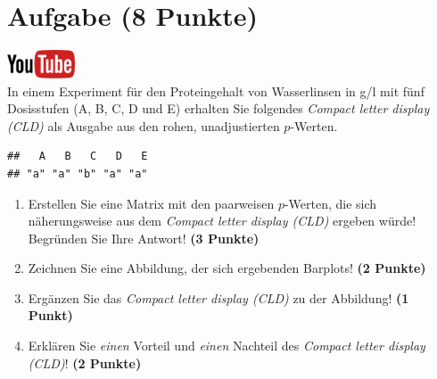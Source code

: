 \documentclass[a4paper, 10pt]{scrartcl}\usepackage[]{graphicx}\usepackage[]{xcolor}
\makeatletter
\newenvironment{kframe}{%
 \def\at@end@of@kframe{}%
 \ifinner\ifhmode%
  \def\at@end@of@kframe{\end{minipage}}%
  \begin{minipage}{\columnwidth}%
 \fi\fi%
 \def\FrameCommand##1{\hskip\@totalleftmargin \hskip-\fboxsep
 \colorbox{shadecolor}{##1}\hskip-\fboxsep
     \hskip-\linewidth \hskip-\@totalleftmargin \hskip\columnwidth}%
 \MakeFramed {\advance\hsize-\width
   \@totalleftmargin\z@ \linewidth\hsize
   \@setminipage}}%
 {\par\unskip\endMakeFramed%
 \at@end@of@kframe}
\newenvironment{knitrout}{}{} %
\makeatother
\begin{document}
 
\clearpage

\section{Aufgabe \hfill (8 Punkte)}


 \hfill\href{https://youtu.be/xq29O8qDrg0}{\includegraphics[width =
   2cm]{img/youtube}}\\[1Ex]


 
 In einem Experiment f{\"u}r den Proteingehalt von Wasserlinsen in g/l mit f{\"u}nf
 Dosisstufen (A, B, C, D und E) erhalten Sie folgendes \textit{Compact
   letter display (CLD)} als \Rlogo Ausgabe aus den rohen, unadjustierten
 $p$-Werten.



\begin{knitrout}
\color{fgcolor}\begin{kframe}
\begin{verbatim}
##   A   B   C   D   E 
## "a" "a" "b" "a" "a"
\end{verbatim}
\end{kframe}
\end{knitrout}

\begin{enumerate}
\item Erstellen Sie eine Matrix mit den paarweisen $p$-Werten, die sich
  n{\"a}herungsweise aus dem \textit{Compact letter display (CLD)} ergeben w{\"u}rde! Begr{\"u}nden Sie Ihre Antwort! \textbf{(3 Punkte)}
\item Zeichnen Sie eine Abbildung, der sich ergebenden Barplots! \textbf{(2 Punkte)}
\item Erg{\"a}nzen Sie das \textit{Compact letter display (CLD)} zu der
  Abbildung! \textbf{(1 Punkt)}
\item Erkl{\"a}ren Sie \textit{einen} Vorteil und \textit{einen} Nachteil des \textit{Compact letter display (CLD)}! \textbf{(2 Punkte)}
\end{enumerate}
\end{document}
